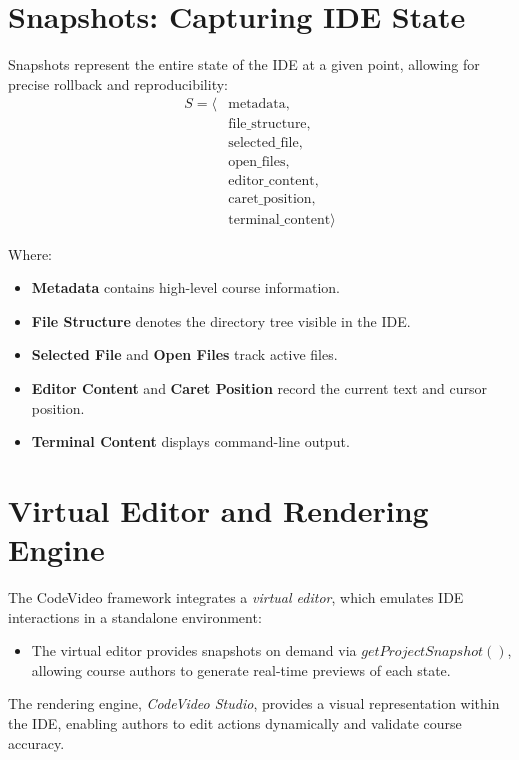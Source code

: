 \documentclass[11pt, a4paper]{article}
\begin{document}
\section{Snapshots: Capturing IDE State}

Snapshots represent the entire state of the IDE at a given point, allowing for precise rollback and reproducibility:
\begin{align*}
    S = \langle & \text{metadata},\\
    & \text{file\_structure},\\
    & \text{selected\_file},\\
    & \text{open\_files},\\
    & \text{editor\_content},\\
    & \text{caret\_position},\\
    & \text{terminal\_content}
    \rangle
\end{align*}

Where:

\begin{itemize}
    \item \textbf{Metadata} contains high-level course information.
    \item \textbf{File Structure} denotes the directory tree visible in the IDE.
    \item \textbf{Selected File} and \textbf{Open Files} track active files.
    \item \textbf{Editor Content} and \textbf{Caret Position} record the current text and cursor position.
    \item \textbf{Terminal Content} displays command-line output.
\end{itemize}

\section{Virtual Editor and Rendering Engine}
The CodeVideo framework integrates a \textit{virtual editor}, which emulates IDE interactions in a standalone environment:
\begin{itemize}
    \item The virtual editor provides snapshots on demand via \( getProjectSnapshot() \), allowing course authors to generate real-time previews of each state.
\end{itemize}

The rendering engine, \textit{CodeVideo Studio}, provides a visual representation within the IDE, enabling authors to edit actions dynamically and validate course accuracy.
\end{document}
